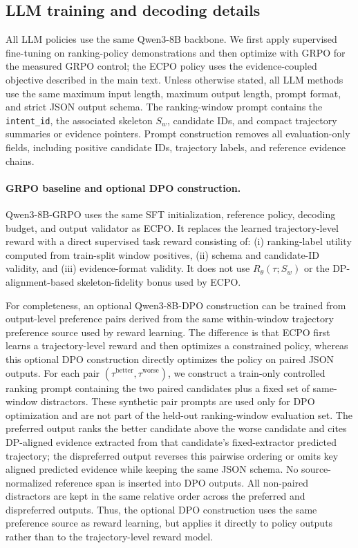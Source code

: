 \documentclass{article}
\begin{document}
\subsection{LLM training and decoding details}
\label{sec:app_llm_training}

All LLM policies use the same Qwen3-8B backbone.
We first apply supervised fine-tuning on ranking-policy demonstrations and then optimize with GRPO for the measured GRPO control; the ECPO policy uses the evidence-coupled objective described in the main text.
Unless otherwise stated, all LLM methods use the same maximum input length, maximum output length, prompt format, and strict JSON output schema.
The ranking-window prompt contains the \texttt{intent\_id}, the associated skeleton $S_w$, candidate IDs, and compact trajectory summaries or evidence pointers.
Prompt construction removes all evaluation-only fields, including positive candidate IDs, trajectory labels, and reference evidence chains.

\paragraph{GRPO baseline and optional DPO construction.}
Qwen3-8B-GRPO uses the same SFT initialization, reference policy, decoding budget, and output validator as ECPO.
It replaces the learned trajectory-level reward with a direct supervised task reward consisting of: (i) ranking-label utility computed from train-split window positives, (ii) schema and candidate-ID validity, and (iii) evidence-format validity.
It does not use $R_\theta(\tau;S_w)$ or the DP-alignment-based skeleton-fidelity bonus used by ECPO.

For completeness, an optional Qwen3-8B-DPO construction can be trained from output-level preference pairs derived from the same within-window trajectory preference source used by reward learning.
The difference is that ECPO first learns a trajectory-level reward and then optimizes a constrained policy, whereas this optional DPO construction directly optimizes the policy on paired JSON outputs.
For each pair $(\tau^{\text{better}},\tau^{\text{worse}})$, we construct a train-only controlled ranking prompt containing the two paired candidates plus a fixed set of same-window distractors.
These synthetic pair prompts are used only for DPO optimization and are not part of the held-out ranking-window evaluation set.
The preferred output ranks the better candidate above the worse candidate and cites DP-aligned evidence extracted from that candidate's fixed-extractor predicted trajectory; the dispreferred output reverses this pairwise ordering or omits key aligned predicted evidence while keeping the same JSON schema.
No source-normalized reference span is inserted into DPO outputs.
All non-paired distractors are kept in the same relative order across the preferred and dispreferred outputs.
Thus, the optional DPO construction uses the same preference source as reward learning, but applies it directly to policy outputs rather than to the trajectory-level reward model.
\end{document}
